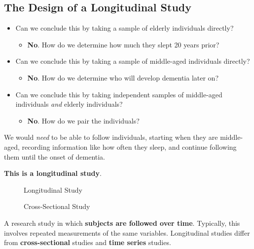 \subsection{The Design of a Longitudinal Study}
\begin{itemize}
    \item Can we conclude this by taking a sample of elderly individuals directly?
          \begin{itemize}
              \item \textbf{No}. How do we determine how much they slept 20 years prior?
          \end{itemize}
    \item Can we conclude this by taking a sample of middle-aged individuals directly?
          \begin{itemize}
              \item \textbf{No}. How do we determine who will develop dementia later on?
          \end{itemize}
    \item Can we conclude this by taking independent samples of middle-aged individuals \emph{and}
          elderly individuals?
          \begin{itemize}
              \item \textbf{No}. How do we pair the individuals?
          \end{itemize}
\end{itemize}
We would \emph{need} to be able to follow individuals, starting when they are middle-aged,
recording information like how often they sleep, and continue following them until the
onset of dementia.
\begin{framed}
    \centering\textbf{This is a longitudinal study}.
\end{framed}
\begin{figure}[H]
    \centering
    \caption{Longitudinal Study}
\end{figure}
\begin{figure}[H]
    \centering
    \caption{Cross-Sectional Study}
\end{figure}
A research study in which \textbf{subjects are followed over time}.
Typically, this involves
repeated measurements of the same variables.
Longitudinal studies differ from \textbf{cross-sectional} studies and
\textbf{time series} studies.
